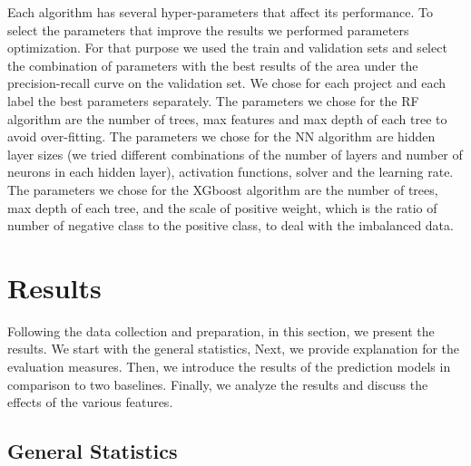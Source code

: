 Each algorithm has several hyper-parameters that affect its performance. To select the parameters that improve the results we performed parameters optimization. For that purpose we used the train and validation sets and select the combination of parameters with
the best results of the area under the precision-recall curve on the validation set. We chose for each project and each label the best parameters separately.
The parameters we chose for the RF algorithm are the number of trees, max features and max depth of each tree to avoid over-fitting. The parameters we chose for the NN algorithm are hidden layer sizes (we tried different combinations of the number of layers and number of neurons in each hidden layer), activation functions, solver and the
learning rate. The parameters we chose for the XGboost algorithm are the number of trees, max depth of each tree, and the scale of %
positive weight, which is the ratio of number of negative class to the positive class, to deal with the imbalanced data.



\section{Results}
\label{sec-results}

Following the data collection and preparation, in this section, we present the results. We start with the general statistics, Next, we provide explanation for the evaluation measures. Then, we introduce the results of the prediction models in comparison to two baselines. Finally, we analyze the results and discuss the effects of the various features.


\subsection{General Statistics}

